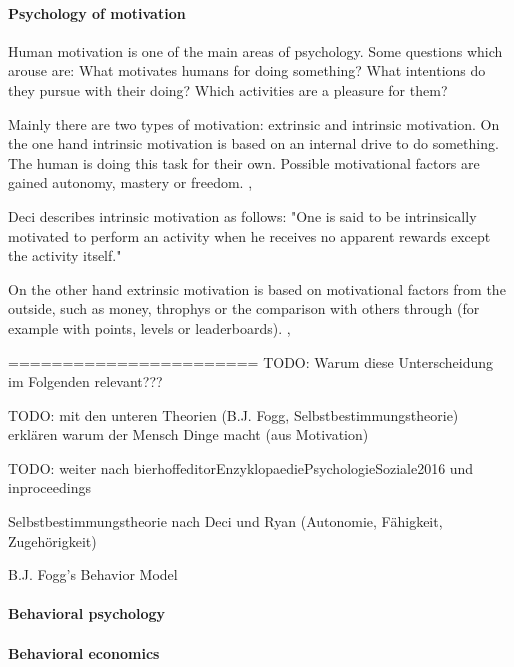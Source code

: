 \paragraph*{Psychology of motivation}
Human motivation is one of the main areas of psychology. Some questions which arouse are: What motivates humans for doing something? What intentions do they pursue with their doing? Which activities are a pleasure for them? \cite[p. 1]{bierhoffeditorEnzyklopaediePsychologieSoziale2016}

Mainly there are two types of motivation: extrinsic and intrinsic motivation. 
On the one hand intrinsic motivation is based on an internal drive to do something. The human is doing this task for their own. Possible motivational factors are gained autonomy, mastery or freedom. \cite[p. 2, 3, 4]{bierhoffeditorEnzyklopaediePsychologieSoziale2016}, \cite[p. 60, 61]{inproceedings}

Deci describes intrinsic motivation as follows: "One is said to be intrinsically motivated to perform an activity when he receives no apparent rewards except the activity itself." \cite[p. 105]{deciEffectsExternallyMediated1971}

On the other hand extrinsic motivation is based on motivational factors from the outside, such as money, throphys or the comparison with others through (for example with points, levels or leaderboards). \cite[p. 2, 3, 4]{bierhoffeditorEnzyklopaediePsychologieSoziale2016}, \cite[p. 60, 61]{inproceedings}

=======================\newline
TODO: Warum diese Unterscheidung im Folgenden relevant???

TODO: mit den unteren Theorien (B.J. Fogg, Selbstbestimmungstheorie) erklären warum der Mensch Dinge macht (aus Motivation)

TODO: weiter nach bierhoffeditorEnzyklopaediePsychologieSoziale2016
und inproceedings

Selbstbestimmungstheorie nach Deci und Ryan (Autonomie, Fähigkeit, Zugehörigkeit)

B.J. Fogg’s Behavior Model

\paragraph*{Behavioral psychology}


\paragraph*{Behavioral economics}

